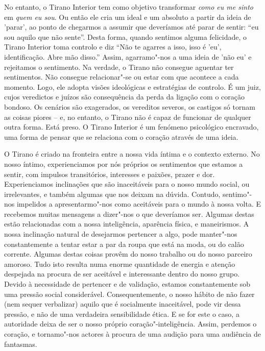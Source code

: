 \sectionBreak

No entanto, o Tirano Interior tem como objetivo transformar \emph{como
eu me sinto} em \emph{quem eu sou}. Ou então ele cria um ideal e um
absoluto a partir da ideia de 'parar', ao ponto de chegarmos a assumir
que deveríamos até parar de sentir: “eu sou aquilo que não sente”. Desta
forma, quando sentimos alguma felicidade, o Tirano Interior toma
controlo e diz “Não te agarres a isso, isso é 'eu', identificação. Abre
mão disso.” Assim, agarramo"-nos a uma ideia de 'não eu' e rejeitamos o
sentimento. Na verdade, o Tirano não consegue aguentar ter sentimentos.
Não consegue relacionar"-se ou estar com que acontece a cada momento.
Logo, ele adopta visões ideológicas e estratégias de controlo. É um
juiz, cujos veredictos e juízos são consequência da perda da ligação com
o coração bondoso. Os cenários são exagerados, os vereditos severos, os
castigos só tornam as coisas piores -- e, no entanto, o Tirano não é
capaz de funcionar de qualquer outra forma. Está preso. O Tirano
Interior é um fenómeno psicológico encravado, uma forma de pensar que se
relaciona com o coração através de uma ideia.

O Tirano é criado na fronteira entre a nossa vida íntima e o contexto
externo. No nosso íntimo, experienciamos por nós próprios os sentimentos
que estamos a sentir, com impulsos transitórios, interesses e paixões,
prazer e dor. Experienciamos inclinações que são inaceitáveis para o
nosso mundo social, ou irrelevantes, e também algumas que nos deixam na
dúvida. Contudo, sentimo"-nos impelidos a apresentarmo"-nos como
aceitáveis para o mundo à nossa volta. E recebemos muitas mensagens a
dizer"-nos o que deveríamos ser. Algumas destas estão relacionadas com a
nossa inteligência, aparência física, e maneirismos. A nossa inclinação
natural de desejarmos pertencer a algo, pode manter"-nos constantemente a
tentar estar a par da roupa que está na moda, ou do calão corrente.
Algumas destas coisas provêm do nosso trabalho ou do nosso parceiro
amoroso. Tudo isto resulta numa enorme quantidade de energia e atenção
despejada na procura de ser aceitável e interessante dentro do nosso
grupo. Devido à necessidade de pertencer e de validação, estamos
constantemente sob uma pressão social considerável. Consequentemente, o
nosso hábito de não fazer (nem sequer verbalizar) aquilo que é
socialmente inaceitável, pode vir dessa pressão, e não de uma verdadeira
sensibilidade ética. E se for este o caso, a autoridade deixa de ser o
nosso próprio coração"-inteligência. Assim, perdemos o coração, e
tornamo"-nos actores à procura de uma audição para uma audiência de
fantasmas.

